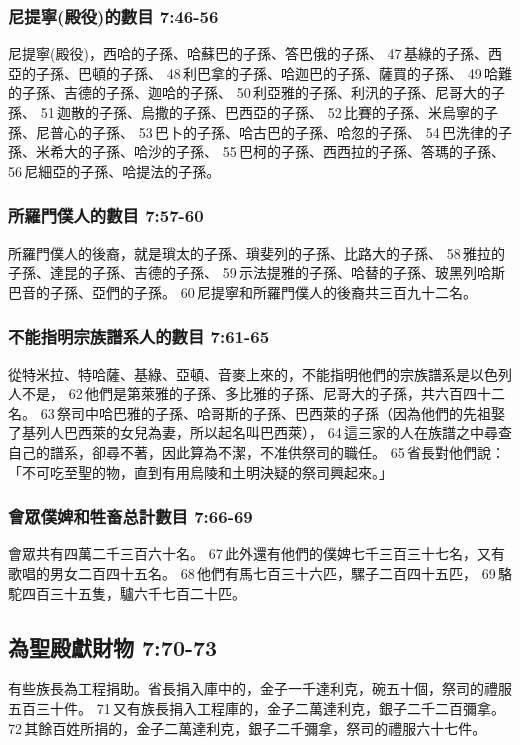 \subsubsection{尼提寧(殿役)的數目 7:46-56}
尼提寧(殿役)，西哈的子孫、哈蘇巴的子孫、答巴俄的子孫、 47 基綠的子孫、西亞的子孫、巴頓的子孫、 48 利巴拿的子孫、哈迦巴的子孫、薩買的子孫、 49 哈難的子孫、吉德的子孫、迦哈的子孫、 50 利亞雅的子孫、利汛的子孫、尼哥大的子孫、 51 迦散的子孫、烏撒的子孫、巴西亞的子孫、 52 比賽的子孫、米烏寧的子孫、尼普心的子孫、 53 巴卜的子孫、哈古巴的子孫、哈忽的子孫、 54 巴洗律的子孫、米希大的子孫、哈沙的子孫、 55 巴柯的子孫、西西拉的子孫、答瑪的子孫、 56 尼細亞的子孫、哈提法的子孫。

\subsubsection{所羅門僕人的數目 7:57-60}
所羅門僕人的後裔，就是瑣太的子孫、瑣斐列的子孫、比路大的子孫、 58 雅拉的子孫、達昆的子孫、吉德的子孫、 59 示法提雅的子孫、哈替的子孫、玻黑列哈斯巴音的子孫、亞們的子孫。 60 尼提寧和所羅門僕人的後裔共三百九十二名。

\subsubsection{不能指明宗族譜系人的數目 7:61-65}
從特米拉、特哈薩、基綠、亞頓、音麥上來的，不能指明他們的宗族譜系是以色列人不是， 62 他們是第萊雅的子孫、多比雅的子孫、尼哥大的子孫，共六百四十二名。 63 祭司中哈巴雅的子孫、哈哥斯的子孫、巴西萊的子孫（因為他們的先祖娶了基列人巴西萊的女兒為妻，所以起名叫巴西萊）， 64 這三家的人在族譜之中尋查自己的譜系，卻尋不著，因此算為不潔，不准供祭司的職任。 65 省長對他們說：「不可吃至聖的物，直到有用烏陵和土明決疑的祭司興起來。」

\subsubsection{會眾僕婢和牲畜总計數目 7:66-69}
會眾共有四萬二千三百六十名。 67 此外還有他們的僕婢七千三百三十七名，又有歌唱的男女二百四十五名。 68 他們有馬七百三十六匹，騾子二百四十五匹， 69 駱駝四百三十五隻，驢六千七百二十匹。

\subsection{為聖殿獻財物 7:70-73}
有些族長為工程捐助。省長捐入庫中的，金子一千達利克，碗五十個，祭司的禮服五百三十件。 71 又有族長捐入工程庫的，金子二萬達利克，銀子二千二百彌拿。 72 其餘百姓所捐的，金子二萬達利克，銀子二千彌拿，祭司的禮服六十七件。

